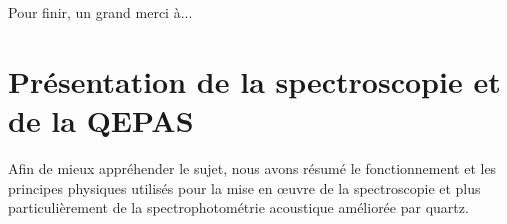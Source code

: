 \documentclass[a4paper]{report}
\begin{document}
Pour finir, un grand merci à... %
		

	
	
	\renewcommand*\contentsname{Sommaire} %
	\tableofcontents
	\pagebreak
	
	
	
	
	
	\renewcommand{\chaptername}{Partie} %
	\chapter{Présentation de la spectroscopie et de la QEPAS}
	Afin de mieux appréhender le sujet, nous avons résumé le fonctionnement et les principes physiques utilisés pour la mise en œuvre de la spectroscopie et plus particulièrement de la spectrophotométrie acoustique améliorée par quartz.
\end{document}
